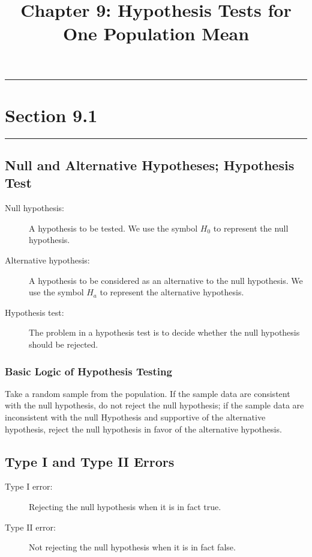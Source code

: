 \documentclass[12pt]{article}
\title{Chapter 9: Hypothesis Tests for One Population Mean}
\author{}
\begin{document}
    \maketitle

    \noindent\rule{\textwidth}{0.4pt}
    \section*{Section 9.1}
    \noindent\rule{\textwidth}{0.4pt}
        \subsection*{Null and Alternative Hypotheses; Hypothesis Test}
            \begin{description}
                \item[Null hypothesis:] A hypothesis to be tested. We use the symbol $H_0$ to
                represent the null hypothesis.
                \item[Alternative hypothesis:] A hypothesis to be considered as an alternative
                to the null hypothesis. We use the symbol $H_a$ to represent the
                alternative hypothesis.
                \item[Hypothesis test:] The problem in a hypothesis test is to decide whether
                the null hypothesis should be rejected.                
            \end{description}
            \subsubsection*{Basic Logic of Hypothesis Testing}
                Take a random sample from the population. If the sample data are consistent
                with the null hypothesis, do not reject the null hypothesis; if the sample data
                are inconsistent with the null Hypothesis and supportive of the alternative
                hypothesis, reject the null hypothesis in favor of the alternative hypothesis.
        \subsection*{Type I and Type II Errors}
            \begin{description}
                \item[Type I error:] Rejecting the null hypothesis when it is in fact true.
                \item[Type II error:] Not rejecting the null hypothesis when it is in fact
                false. 
            \end{description}    
\end{document}
